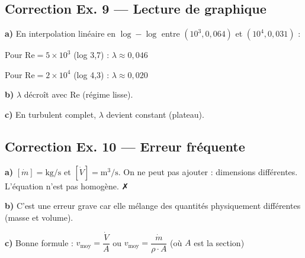 \subsection*{Correction Ex. 9 — Lecture de graphique}

\textbf{a)} En interpolation linéaire en $\log-\log$ entre $(10^3, 0{,}064)$ et $(10^4, 0{,}031)$ :

Pour $\mathrm{Re} = 5 \times 10^3$ (log 3,7) : $\lambda \approx 0{,}046$

Pour $\mathrm{Re} = 2 \times 10^4$ (log 4,3) : $\lambda \approx 0{,}020$

\textbf{b)} $\lambda$ décroît avec $\mathrm{Re}$ (régime lisse).

\textbf{c)} En turbulent complet, $\lambda$ devient constant (plateau).

\subsection*{Correction Ex. 10 — Erreur fréquente}

\textbf{a)} $[\dot{m}] = \mathrm{kg/s}$ et $[\dot{V}] = \mathrm{m^3/s}$. 
On ne peut pas ajouter : dimensions différentes. L'équation n'est pas homogène. ✗

\textbf{b)} C'est une erreur grave car elle mélange des quantités physiquement différentes (masse et volume).

\textbf{c)} Bonne formule : $v_{\text{moy}} = \dfrac{\dot{V}}{A}$ ou $v_{\text{moy}} = \dfrac{\dot{m}}{\rho \cdot A}$ (où $A$ est 
la section)
